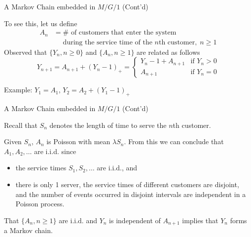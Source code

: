 \documentclass[letterpaper]{beamer}
\begin{document}
\begin{frame}{A Markov Chain embedded in $M/G/1$ (Cont'd)}


To see this, let us define
\begin{align*}
A_n &=\#\mbox{ of customers that enter the system}\\
&\quad\mbox{ during the service time of the $n$th customer},\; n\ge 1
\end{align*}
Observed that $\{Y_n, n\ge 0\}$ and $\{A_n,n\ge 1\}$ are related as follows
$$
Y_{n+1} =A_{n+1}+(Y_n-1)_+=
\begin{cases}
Y_n-1+A_{n+1} & \mbox{if } Y_n>0\\
A_{n+1} & \mbox{if } Y_n=0
\end{cases}
$$

Example: $Y_1 = A_1$, $Y_2 = A_2 + (Y_1 - 1)_+$ \\

\end{frame}
\begin{frame}{A Markov Chain embedded in $M/G/1$ (Cont'd)}

Recall that $S_n$ denotes the length of time to serve the $n$th customer.\par\smallskip

Given $S_n$, $A_n$ is Poisson with mean $\lambda S_n$.
From this we can conclude that $A_1,A_2,\ldots$ are i.i.d. since
\begin{itemize}
\item the service times $S_1, S_2,\ldots$ are i.i.d., and
\item there is only 1 server, the service times of different customers are disjoint, and the number of events occurred in disjoint intervals are independent in a Poisson process.
\end{itemize}
That $\{A_n,n\ge 1\}$ are i.i.d. and $Y_n$ is independent of $A_{n+1}$ implies that $Y_n$ forms a Markov chain.

\end{frame}
\end{document}
